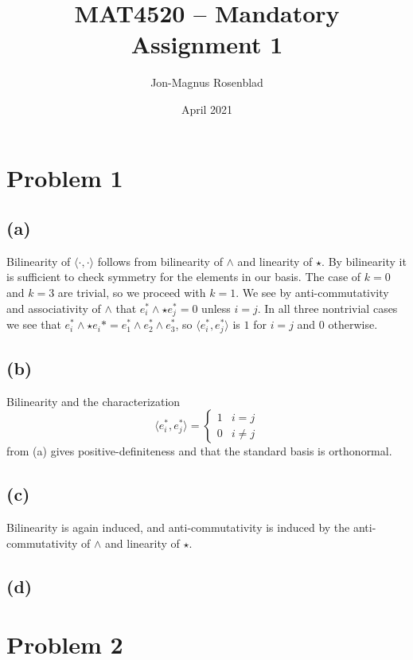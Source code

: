 \documentclass[english]{article}
\author{Jon-Magnus Rosenblad}
\date{April 2021}
\title{MAT4520 -- Mandatory Assignment 1}
\begin{document}
\maketitle

\section*{Problem 1}
\subsection*{(a)}
Bilinearity of $\langle\cdot,\cdot\rangle$ follows from bilinearity of $\wedge$ and linearity of $\star$.
By bilinearity it is sufficient to check symmetry for the elements in our basis.
The case of $k=0$ and $k=3$ are trivial, so we proceed with $k=1$.
We see by anti-commutativity and associativity of $\wedge$
that $e_i^\ast \wedge \star e_j^\ast =0$ unless $i=j$.
In all three nontrivial cases we see that $e_i^\ast\wedge\star e_i\ast=e_1^\ast\wedge e_2^\ast\wedge e_3^\ast$,
so $\langle e_i^\ast,e_j^\ast\rangle$ is $1$ for $i=j$ and $0$ otherwise.

\subsection*{(b)}
Bilinearity and the characterization
\begin{equation*}
    \langle e_i^\ast, e_j^\ast\rangle = \begin{cases}
        1 & i=j\\
        0 & i\neq j
    \end{cases}
\end{equation*}
from (a) gives positive-definiteness and that the standard basis is orthonormal.

\subsection*{(c)}
Bilinearity is again induced, and anti-commutativity is induced by the anti-commutativity of $\wedge$ and linearity of $\star$.

\subsection*{(d)}
\todo{}

\section*{Problem 2}
\end{document}
